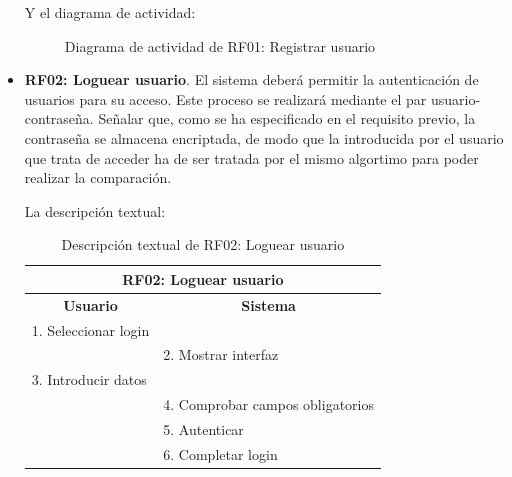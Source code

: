 \begin{itemize}
	\FloatBarrier
	Y el diagrama de actividad:
	\begin{figure}[!htb]
		\centering
		\caption{Diagrama de actividad de RF01: Registrar usuario}
		\label{fig:diagramaActividad_RF01}
	\end{figure}
	 
	\item \textbf{RF02: Loguear usuario}. El sistema deberá permitir la autenticación de usuarios para su acceso. Este proceso se realizará mediante el par usuario-contraseña. Señalar que, como se ha especificado en el requisito previo, la contraseña se almacena encriptada, de modo que la introducida por el usuario que trata de acceder ha de ser tratada por el mismo algortimo para poder realizar la comparación.
	
	La descripción textual:
	\begin{table}[h]
		\centering	
		\begin{tabular}{|l|l|}
			\hline
			\multicolumn{2}{|c|}{\textbf{RF02: Loguear usuario}} \\ \hline
			\multicolumn{1}{|c|}{\textbf{Usuario}} & \multicolumn{1}{c|}{\textbf{Sistema}} \\ \hline
			1. Seleccionar login &\\ \hline
			& 2. Mostrar interfaz \\ \hline
			3. Introducir datos &\\ \hline
			& 4. Comprobar campos obligatorios \\ \hline
			& 5. Autenticar \\ \hline
			& 6. Completar login\\ \hline
		\end{tabular}
		\caption{Descripción textual de RF02: Loguear usuario}
		\label{tab:tablaDescTextualRF02}
	\end{table}
	

\end{itemize}
